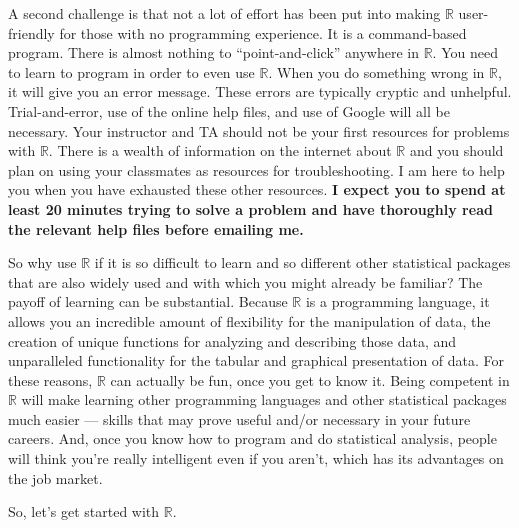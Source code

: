 \documentclass[12pt]{article}
\begin{document}
A second challenge is that not a lot of effort has been put into making $\mathbb{R}$ user-friendly for those with no programming experience. It is a command-based program. There is almost nothing to ``point-and-click'' anywhere in $\mathbb{R}$. You need to learn to program in order to even use $\mathbb{R}$. When you do something wrong in $\mathbb{R}$, it will give you an error message. These errors are typically cryptic and unhelpful. Trial-and-error, use of the online help files, and use of Google will all be necessary. Your instructor and TA should not be your first resources for problems with $\mathbb{R}$. There is a wealth of information on the internet about $\mathbb{R}$ and you should plan on using your classmates as resources for troubleshooting. I am here to help you when you have exhausted these other resources. \textbf{I expect you to spend at least 20 minutes trying to solve a problem and have thoroughly read the relevant help files before emailing me.}

So why use $\mathbb{R}$ if it is so difficult to learn and so different other statistical packages that are also widely used and with which you might already be familiar? The payoff of learning can be substantial. Because $\mathbb{R}$ is a programming language, it allows you an incredible amount of flexibility for the manipulation of data, the creation of unique functions for analyzing and describing those data, and unparalleled functionality for the tabular and graphical presentation of data. For these reasons, $\mathbb{R}$ can actually be fun, once you get to know it. Being competent in $\mathbb{R}$ will make learning other programming languages and other statistical packages much easier --- skills that may prove useful and/or necessary in your future careers. And, once you know how to program and do statistical analysis, people will think you're really intelligent even if you aren't, which has its advantages on the job market.

So, let's get started with $\mathbb{R}$.
\end{document}
